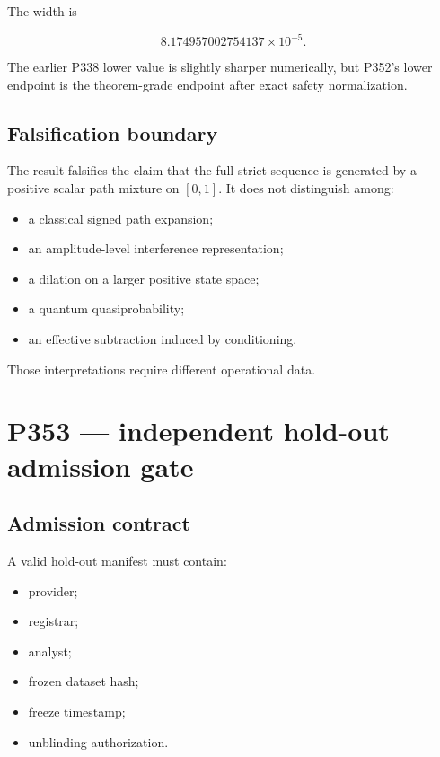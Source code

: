 \documentclass[11pt,a4paper,openany]{report}
\begin{document}
The width is

\[
8.174957002754137\times10^{-5}.
\]

The earlier P338 lower value is slightly sharper numerically, but P352's lower endpoint is the theorem-grade endpoint after exact safety normalization.

\section{Falsification boundary}

The result falsifies the claim that the full strict sequence is generated by a positive scalar path mixture on \([0,1]\). It does not distinguish among:

\begin{itemize}
\item 
a classical signed path expansion;

\item 
an amplitude-level interference representation;

\item 
a dilation on a larger positive state space;

\item 
a quantum quasiprobability;

\item 
an effective subtraction induced by conditioning.

\end{itemize}

Those interpretations require different operational data.

\chapter{P353 --- independent hold-out admission gate}

\section{Admission contract}

A valid hold-out manifest must contain:

\begin{itemize}
\item 
provider;

\item 
registrar;

\item 
analyst;

\item 
frozen dataset hash;

\item 
freeze timestamp;

\item 
unblinding authorization.

\end{itemize}
\end{document}
